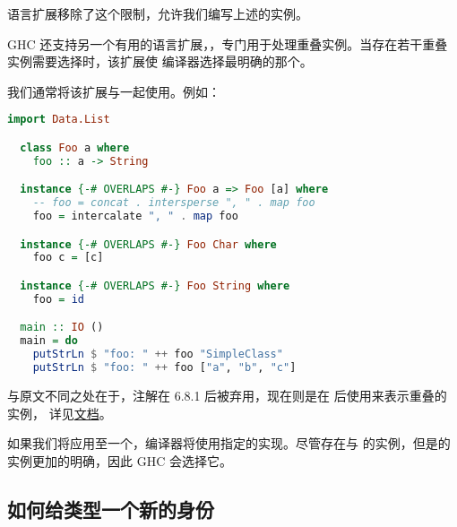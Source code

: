 \documentclass[./main.tex]{subfiles}
\begin{document}
语言扩展移除了这个限制，允许我们编写上述的实例。

GHC 还支持另一个有用的语言扩展，，专门用于处理重叠实例。当存在若干重叠实例需要选择时，该扩展使
编译器选择最明确的那个。

我们通常将该扩展与一起使用。例如：

\begin{lstlisting}[language=Haskell]
  import Data.List

  class Foo a where
    foo :: a -> String

  instance {-# OVERLAPS #-} Foo a => Foo [a] where
    -- foo = concat . intersperse ", " . map foo
    foo = intercalate ", " . map foo

  instance {-# OVERLAPS #-} Foo Char where
    foo c = [c]

  instance {-# OVERLAPS #-} Foo String where
    foo = id

  main :: IO ()
  main = do
    putStrLn $ "foo: " ++ foo "SimpleClass"
    putStrLn $ "foo: " ++ foo ["a", "b", "c"]
\end{lstlisting}

与原文不同之处在于，注解在 6.8.1 后被弃用，现在则是在
后使用来表示重叠的实例，
详见\href{https://ghc.gitlab.haskell.org/ghc/doc/users_guide/exts/instances.html#overlapping-instances}{文档}。

如果我们将应用至一个，编译器将使用指定的实现。尽管存在\acode{[a]}与
的实例，但是的实例更加的明确，因此 GHC 会选择它。

\subsection*{如何给类型一个新的身份}



\begin{lstlisting}[language=Haskell]

\end{lstlisting}



\begin{lstlisting}[language=Haskell]

\end{lstlisting}



\begin{lstlisting}[language=Haskell]

\end{lstlisting}
\end{document}
